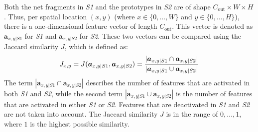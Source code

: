 Both the net fragments in \emph{S1} and the prototypes in \emph{S2} are of shape $C_{\text{out}} \times W \times H$. Thus, per spatial location $(x,y)$ (where $x \in \{0, ..., W\}$ and $y \in \{0, ..., H\}$), there is a one-dimensional feature vector of length $C_{\text{out}}$. This vector is denoted as $\boldsymbol{a}_{x,y|S1}$ for \emph{S1} and $\boldsymbol{a}_{x,y|S2}$ for \emph{S2}.
These two vectors can be compared using the Jaccard similarity $J$, which is defined as:
%
\begin{align}\eqlbl{jaccard}
	J_{x,y} = J(\boldsymbol{a}_{x,y|S1}, \boldsymbol{a}_{x,y|S2}) = \frac{|\boldsymbol{a}_{x,y|S1} \cap \boldsymbol{a}_{x,y|S2}|}{|\boldsymbol{a}_{x,y|S1} \cup \boldsymbol{a}_{x,y|S2}|}
\end{align}
%
The term $|\boldsymbol{a}_{x,y|S1} \cap \boldsymbol{a}_{x,y|S2}|$ describes the number of features that are activated in both \emph{S1} and \emph{S2}, while the second term $|\boldsymbol{a}_{x,y|S1} \cup \boldsymbol{a}_{x,y|S2}|$ is the number of features that are activated in either \emph{S1} or \emph{S2}. Features that are deactivated in \emph{S1} and \emph{S2} are not taken into account.
The Jaccard similarity $J$ is in the range of $0, ..., 1$, where $1$ is the highest possible similarity.

